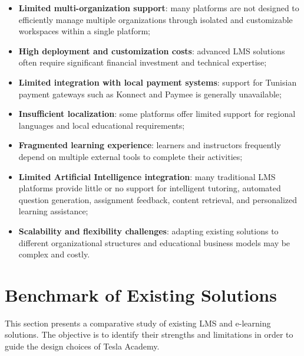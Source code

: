 \begin{itemize}
  \item \textbf{Limited multi-organization support}: many platforms are not designed to
        efficiently manage multiple organizations through isolated and customizable
        workspaces within a single platform;

  \item \textbf{High deployment and customization costs}: advanced LMS solutions often
        require significant financial investment and technical expertise;

  \item \textbf{Limited integration with local payment systems}: support for Tunisian
        payment gateways such as Konnect and Paymee is generally unavailable;

  \item \textbf{Insufficient localization}: some platforms offer limited support for
        regional languages and local educational requirements;

  \item \textbf{Fragmented learning experience}: learners and instructors frequently depend
        on multiple external tools to complete their activities;

  \item \textbf{Limited Artificial Intelligence integration}: many traditional LMS
        platforms provide little or no support for intelligent tutoring, automated question
        generation, assignment feedback, content retrieval, and personalized learning
        assistance;

  \item \textbf{Scalability and flexibility challenges}: adapting existing solutions to
        different organizational structures and educational business models may be complex
        and costly.
\end{itemize}

\section{Benchmark of Existing Solutions}

This section presents a comparative study of existing LMS and e-learning solutions. The
objective is to identify their strengths and limitations in order to guide the design
choices of Tesla Academy.


